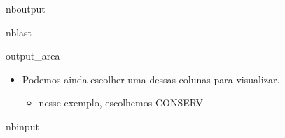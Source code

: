 \documentclass[letterpaper,10pt,brazil]{sphinxmanual}
\begin{document}
\begin{sphinxuseclass}{nboutput}
\begin{sphinxuseclass}{nblast}
{\begin{sphinxuseclass}{output_area}
\begin{sphinxuseclass}{}
\end{sphinxuseclass}
\end{sphinxuseclass}
}

\end{sphinxuseclass}
\end{sphinxuseclass}\begin{itemize}
\item {} 
\sphinxAtStartPar
Podemos ainda escolher uma dessas colunas para visualizar.
\begin{itemize}
\item {} 
\sphinxAtStartPar
nesse exemplo, escolhemos CONSERV

\end{itemize}

\end{itemize}

\begin{sphinxuseclass}{nbinput}
{
\begin{sphinxVerbatim}[commandchars=\\\{\}]
\llap{\color{nbsphinxin}[6]:\,\hspace{\fboxrule}\hspace{\fboxsep}}
\end{sphinxVerbatim}
}

\end{sphinxuseclass}
\end{document}

